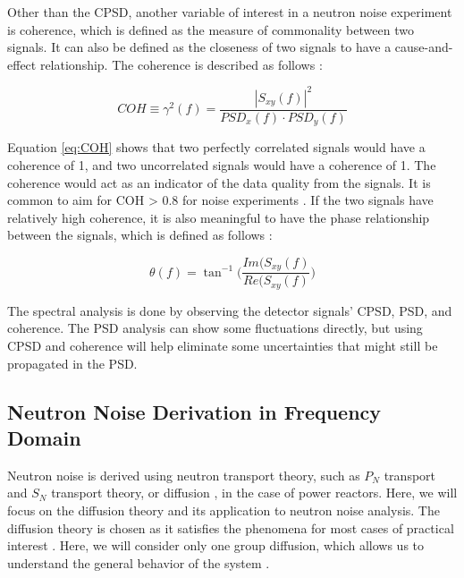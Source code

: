 Other than the CPSD, another variable of interest in a neutron noise experiment is coherence, which is defined as the measure of commonality between two signals. It can also be defined as the closeness of two signals to have a cause-and-effect relationship. The coherence is described as follows \cite{fryAnalysisNeutrondensityOscillations1975}:

\begin{equation}
    COH \equiv \gamma^2 (f) = \frac{|S_{xy} (f)|^2}{PSD_x (f) \cdot PSD_y (f)}
    \label{eq:COH}
\end{equation}

Equation \ref{eq:COH} shows that two perfectly correlated signals would have a coherence of 1, and two uncorrelated signals would have a coherence of 1. The coherence would act as an indicator of the data quality from the signals. It is common to aim for COH > 0.8 for noise experiments \cite{ambrozicNoiseAnalysisTechniques2020}. If the two signals have relatively high coherence, it is also meaningful to have the phase relationship between the signals, which is defined as follows \cite{fryAnalysisNeutrondensityOscillations1975}:

\begin{equation}
    \theta (f) = \tan^{-1} \biggr( \frac{Im(S_{xy} (f)}{Re(S_{xy} (f)} \biggr)
\end{equation}

The spectral analysis is done by observing the detector signals’ CPSD, PSD, and coherence. The PSD analysis can show some fluctuations directly, but using CPSD and coherence will help eliminate some uncertainties that might still be propagated in the PSD.

\subsection{Neutron Noise Derivation in Frequency Domain}

Neutron noise is derived using neutron transport theory, such as $P_N$ transport and $S_N$ transport theory, or diffusion \cite{bahramiNewApproachCalculation2020, demaziereDevelopment2D2group2004}, in the case of power reactors. Here, we will focus on the diffusion theory and its application to neutron noise analysis. The diffusion theory is chosen as it satisfies the phenomena for most cases of practical interest \cite{pazsitNoiseTechniquesNuclear2010}. Here, we will consider only one group diffusion, which allows us to understand the general behavior of the system \cite{pazsitNoiseTechniquesNuclear2010}. 

